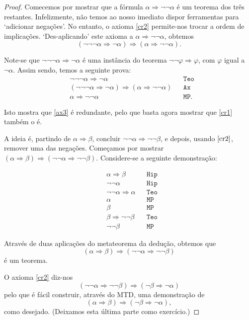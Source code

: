 \documentclass{report}
\theoremstyle{definition}
\theoremstyle{remark}
\newcommand{\imply}{\mathbin{\Rightarrow}}
\begin{document}
	\begin{proof}
	Comecemos por mostrar que a fórmula $\alpha \imply \neg\neg\alpha$ é um teorema dos três restantes. Infelizmente, não temos ao nosso imediato dispor ferramentas para `adicionar negações'. No entanto, o axioma \eqref{cr2} permite-nos trocar a ordem de implicações. `Des-aplicando' este axioma a $\alpha \imply \neg\neg\alpha$, obtemos
	\[(\neg\neg\neg\alpha \imply \neg\alpha) \imply (\alpha \imply \neg\neg\alpha).\]
	
	Note-se que $\neg\neg\neg\alpha \imply \neg\alpha$ é uma instância do teorema $\neg\neg\varphi \imply \varphi$, com $\varphi$ igual a $\neg \alpha$. Assim sendo, temos a seguinte prova:
	\begin{align*}
	&\neg\neg\neg\alpha \imply \neg\alpha&&\texttt{Teo}\\
	&(\neg\neg\neg\alpha \imply \neg\alpha) \imply (\alpha \imply \neg\neg\alpha)&&\texttt{Ax}\\
	&\alpha \imply \neg\neg\alpha&&\texttt{MP}.
	\end{align*}
	
	Isto mostra que \eqref{ax3} é redundante, pelo que basta agora mostrar que \eqref{cr1} também o é.
	
	A ideia é, partindo de $\alpha \imply \beta$, concluir $\neg \neg \alpha \imply \neg \neg \beta$, e depois, usando $\eqref{cr2}$, remover uma das negações. Começamos por mostrar $(\alpha \imply \beta) \imply (\neg\neg\alpha \imply \neg\neg\beta)$. Considere-se a seguinte demonstração:
	
	\begin{align*}
	&\alpha \imply \beta&&\texttt{Hip}\\
	&\neg\neg\alpha&&\texttt{Hip}\\
	&\neg\neg\alpha \imply \alpha&&\texttt{Teo}\\
	&\alpha&&\texttt{MP}\\
	&\beta&&\texttt{MP}\\
	&\beta \imply \neg\neg\beta&&\texttt{Teo}\\
	&\neg\neg\beta&&\texttt{MP}
	\end{align*}
	
	Através de duas aplicações do metateorema da dedução, obtemos que
	\[(\alpha \imply \beta) \imply (\neg\neg\alpha \imply \neg\neg\beta)\]
	é um teorema.
	
	O axioma \eqref{cr2} diz-nos
	\[
	(\neg\neg\alpha \imply \neg\neg\beta) \imply (\neg \beta \imply \neg \alpha)
	\]
	pelo que é fácil construir, através do MTD, uma demonstração de
	\[(\alpha \imply \beta) \imply (\neg \beta \imply \neg \alpha),\]
	como desejado. (Deixamos esta última parte como exercício.)
	\end{proof}
	
\end{document}
